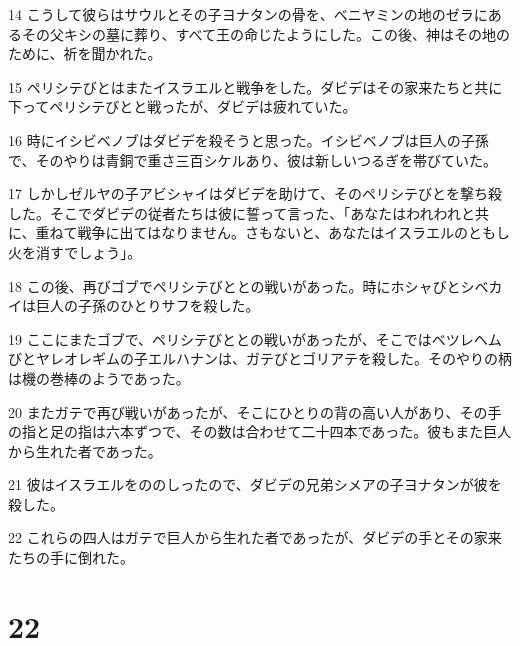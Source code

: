 \par 14 こうして彼らはサウルとその子ヨナタンの骨を、ベニヤミンの地のゼラにあるその父キシの墓に葬り、すべて王の命じたようにした。この後、神はその地のために、祈を聞かれた。
\par 15 ペリシテびとはまたイスラエルと戦争をした。ダビデはその家来たちと共に下ってペリシテびとと戦ったが、ダビデは疲れていた。
\par 16 時にイシビベノブはダビデを殺そうと思った。イシビベノブは巨人の子孫で、そのやりは青銅で重さ三百シケルあり、彼は新しいつるぎを帯びていた。
\par 17 しかしゼルヤの子アビシャイはダビデを助けて、そのペリシテびとを撃ち殺した。そこでダビデの従者たちは彼に誓って言った、「あなたはわれわれと共に、重ねて戦争に出てはなりません。さもないと、あなたはイスラエルのともし火を消すでしょう」。
\par 18 この後、再びゴブでペリシテびととの戦いがあった。時にホシャびとシベカイは巨人の子孫のひとりサフを殺した。
\par 19 ここにまたゴブで、ペリシテびととの戦いがあったが、そこではベツレヘムびとヤレオレギムの子エルハナンは、ガテびとゴリアテを殺した。そのやりの柄は機の巻棒のようであった。
\par 20 またガテで再び戦いがあったが、そこにひとりの背の高い人があり、その手の指と足の指は六本ずつで、その数は合わせて二十四本であった。彼もまた巨人から生れた者であった。
\par 21 彼はイスラエルをののしったので、ダビデの兄弟シメアの子ヨナタンが彼を殺した。
\par 22 これらの四人はガテで巨人から生れた者であったが、ダビデの手とその家来たちの手に倒れた。

\chapter{22}

